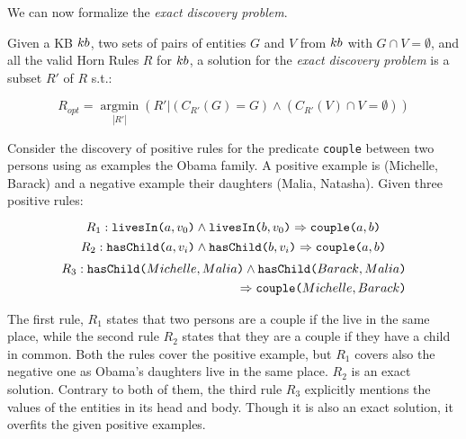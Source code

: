 We can now formalize the \emph{exact discovery problem}. %

\begin{definition}
	Given a KB ${\sc kb}$, two sets of pairs of entities $G$ and $V$ from ${\sc kb}$ with $G \cap V = \emptyset$, and all the valid Horn Rules $R$ for ${\sc kb}$, a solution for the \emph{exact discovery problem} is a subset $R'$ of $R$  s.t.:
	
	\vspace{-6mm}	
	\begin{equation*}
		R_{opt}=\underset{|R'|}{\operatorname{argmin}}(R'|(C_{R'}(G) = G) \wedge (C_{R'}(V) \cap V = \emptyset) )	\end{equation*}
	\end{definition}
	\vspace{-1ex}	

\begin{example}
	Consider the discovery of positive rules for the predicate {\tt couple} between two persons using as examples the Obama family. A positive example is (Michelle, Barack) and a negative example their daughters (Malia, Natasha). 
	Given three positive rules:
	
	\vspace{-4ex}	
	{\small	
		\begin{equation*}
		R_{1}:	\texttt{livesIn(}a,v_0\texttt{)} \wedge \texttt{livesIn(}b,v_0\texttt{)} \Rightarrow  \texttt{couple(}a,b\texttt{)}  
		\end{equation*}
			\vspace{-3ex}	
		\begin{equation*}
		R_{2}:	\texttt{hasChild(}a,v_i\texttt{)} \wedge \texttt{hasChild(}b,v_i\texttt{)} \Rightarrow  \texttt{couple(}a,b\texttt{)}  
		\end{equation*}
		\vspace{-3ex}	
		\begin{equation*}
			\begin{split}
			R_{3}:	\texttt{hasChild(}Michelle,Malia\texttt{)} \wedge  \texttt{hasChild(}Barack,Malia\texttt{)} \\ \Rightarrow \texttt{couple(}Michelle,Barack\texttt{)}
			\end{split}
		\end{equation*}
	}
	\vspace{-3ex}	
	
	\noindent
	The first rule, $R_{1}$ states that two persons are a couple if the live in the same place, while the second rule $R_{2}$ states that they are a couple if they have a child in common. Both the rules cover the positive example, but $R_{1}$ covers also the negative one as Obama's daughters live in the same place. $R_{2}$ is an exact solution. Contrary to both of them, the third rule $R_{3}$ explicitly mentions the values of the entities in its head and body. Though it is also an exact solution, it overfits the given positive examples. %
\end{example} 

